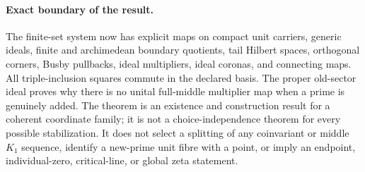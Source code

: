 \paragraph{Exact boundary of the result.}
The finite-set system now has explicit maps on compact unit carriers, generic
ideals, finite and archimedean boundary quotients, tail Hilbert spaces,
orthogonal corners, Busby pullbacks, ideal multipliers, ideal coronas, and
connecting maps.  All triple-inclusion squares commute in the declared basis.
The proper old-sector ideal proves why there is no unital full-middle
multiplier map when a prime is genuinely added.  The theorem is an existence
and construction result for a coherent coordinate family; it is not a
choice-independence theorem for every possible stabilization.  It does not
select a splitting of any coinvariant or middle $K_1$ sequence, identify a
new-prime unit fibre with a point, or imply an endpoint, individual-zero,
critical-line, or global zeta statement.
